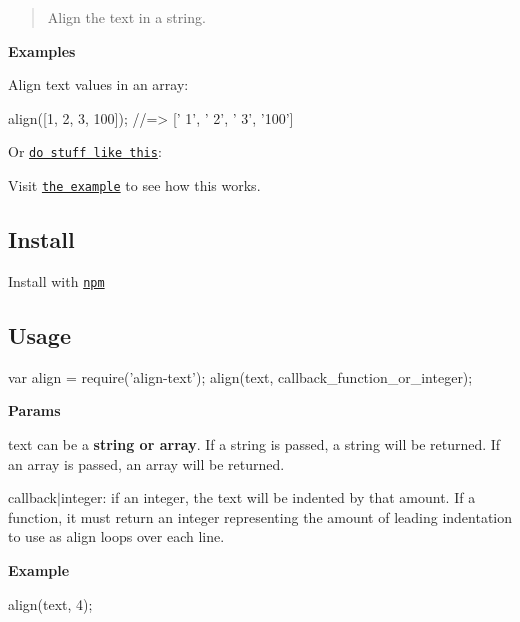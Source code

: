 \begin{quote}
Align the text in a string. \end{quote}


{\bfseries Examples}

Align text values in an array\+:


\begin{DoxyCode}
align([1, 2, 3, 100]);
//=> ['  1', '  2', '  3', '100']
\end{DoxyCode}


Or \href{./example.js}{\tt do stuff like this}\+:

\href{./example.js}{\tt }

Visit \href{./example.js}{\tt the example} to see how this works.

\subsection*{Install}

Install with \href{https://www.npmjs.com/}{\tt npm}




\subsection*{Usage}


\begin{DoxyCode}
var align = require('align-text');
align(text, callback\_function\_or\_integer);
\end{DoxyCode}


{\bfseries Params}


\begin{DoxyItemize}
\item {\ttfamily text} can be a {\bfseries string or array}. If a string is passed, a string will be returned. If an array is passed, an array will be returned.
\item {\ttfamily callback$\vert$integer}\+: if an integer, the text will be indented by that amount. If a function, it must return an integer representing the amount of leading indentation to use as {\ttfamily align} loops over each line.
\end{DoxyItemize}

{\bfseries Example}


\begin{DoxyCode}
align(text, 4);
\end{DoxyCode}


